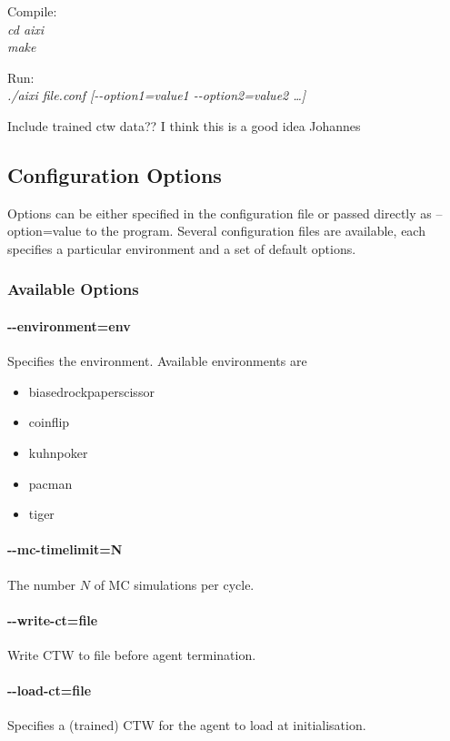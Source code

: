\documentclass[paper=a4, fontsize=11pt]{scrartcl} %
\numberwithin{equation}{section} %
\numberwithin{figure}{section} %
\numberwithin{table}{section} %
\begin{document}
\setlength\parindent{20pt}
\noindent Compile:\\
\indent \textit{cd aixi}\\
\indent \textit{make}

\bigskip

\noindent Run:\\
\indent \textit{./aixi file.conf [-{}-option1=value1 -{}-option2=value2 \dots]}
\setlength\parindent{0pt}

Include trained ctw data?? I think this is a good idea Johannes

\subsection{Configuration Options}

Options can be either specified in the configuration file or passed directly as --option=value to the program. Several configuration files are available, each specifies a particular environment and a set of default options. 

\subsubsection*{Available Options}

\paragraph{-{}-environment=env} Specifies the environment. Available environments are
\begin{itemize}
\itemsep0pt
\renewcommand\labelitemi{--}
    \item biased\textunderscore rock\textunderscore paper\textunderscore scissor
    \item coinflip
    \item kuhn\textunderscore poker
    \item pacman
    \item tiger
\end{itemize}

\paragraph{-{}-mc-timelimit=N} The number $N$ of MC simulations per cycle.
\paragraph{-{}-write-ct=file} Write CTW to file before agent termination.
\paragraph{-{}-load-ct=file} Specifies a (trained) CTW for the agent to load at initialisation.
\end{document}
